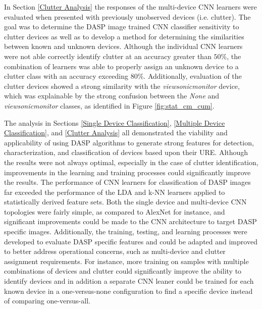 In Section \ref{Clutter Analysis} the responses of the multi-device CNN learners were evaluated when presented with previously unobserved devices (i.e. clutter).  The goal was to determine the DASP image trained CNN classifier sensitivity to clutter devices as well as to develop a method for determining the similarities between known and unknown devices.  Although the individual CNN learners were not able correctly identify clutter at an accuracy greater than $50\%$, the combination of learners was able to properly assign an unknown device to a clutter class with an accuracy exceeding $80\%$.   Additionally, evaluation of the clutter devices showed a strong similarity with the \textit{viewsonicmonitor} device, which was explainable by the strong confusion between the \textit{None} and \textit{viewsonicmonitor} classes, as identified in Figure \ref{fig:stat_cm_cum}.

The analysis in Sections \ref{Single Device Classification}, \ref{Multiple Device Classification}, and \ref{Clutter Analysis} all demonstrated the viability and applicability of using DASP algorithms to generate strong features for detection, characterization, and classification of devices based upon their URE.  Although the results were not always optimal, especially in the case of clutter identification, improvements in the learning and training processes could significantly improve the results.  The performance of CNN learners for classification of DASP images far exceeded the performance of the LDA and k-NN learners applied to statistically derived feature sets.  Both the single device and multi-device CNN topologies were fairly simple, as compared to AlexNet \cite{Krizhevsky2012} for instance, and significant improvements could be made to the CNN architecture to target DASP specific images.  Additionally, the training, testing, and learning processes were developed to evaluate DASP specific features and could be adapted and improved to better address operational concerns, such as multi-device and clutter assignment requirements.  For instance, more training on samples with multiple combinations of devices and clutter could significantly improve the ability to identify devices and in addition a separate CNN leaner could be trained for each known device in a one-versus-none configuration to find a specific device instead of comparing one-versus-all. 

